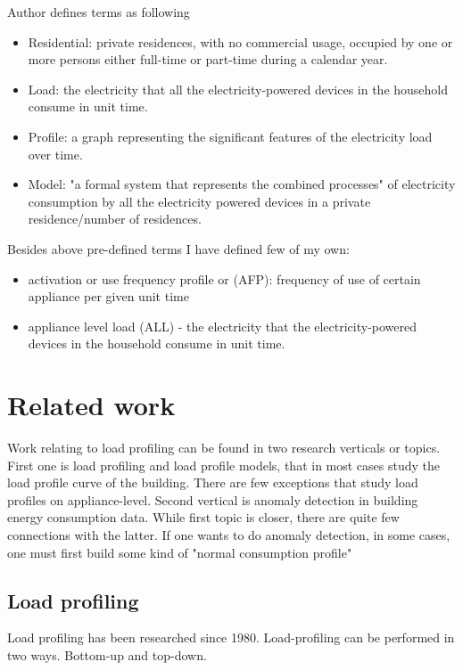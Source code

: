 \documentclass[
11pt, %
english, %
singlespacing, %
headsepline, %
]{MastersDoctoralThesis} %
\begin{document}
Author \cite{Review2021} defines terms as following

\begin{itemize}
	\item Residential: private residences, with no commercial usage, occupied by one or more persons either full-time or part-time during a calendar year.
	\item Load: the electricity that all the electricity-powered devices in the household consume in unit time.
	\item Profile: a graph representing the significant features of the electricity load over time.
	\item Model: "a formal system that represents the combined processes" \cite{KAVOUSIAN2013184} of electricity consumption by all the electricity powered devices in a private residence/number of residences.
\end{itemize}

Besides above pre-defined terms I have defined few of my own:
\begin{itemize}
	\item activation or use frequency profile or (AFP): frequency of use of certain appliance per given unit time
	\item appliance level load (ALL) - the electricity that the electricity-powered devices in the household consume in unit time.
\end{itemize}

\section{Related work}

Work relating to load profiling can be found in two research verticals or topics. First one is load profiling and load profile models, that in 
most cases study the load profile curve of the building. There are few exceptions that study load profiles on appliance-level.
Second vertical is anomaly detection in building energy consumption data. While first topic is closer, there are quite few connections with the latter. 
If one wants to do anomaly detection, in some cases, one must first build some kind of "normal consumption profile" 

\subsection{Load profiling}

Load profiling has been researched since 1980. Load-profiling can be performed in two ways. Bottom-up and top-down. 
\end{document}
